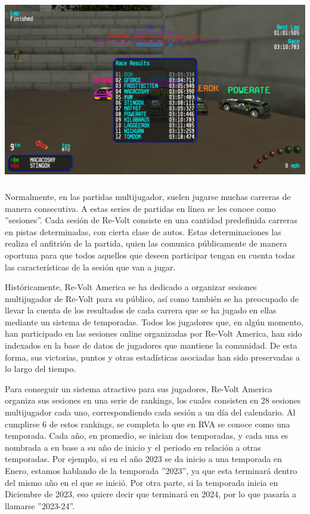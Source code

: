 \includegraphics[width=15cm, height=8cm]{img/results.png}

Normalmente, en las partidas multijugador, suelen jugarse muchas carreras de manera consecutiva. A estas series de partidas en línea se les conoce como ''sesiones''. Cada sesión de Re-Volt consiste en una cantidad predefinida carreras en pistas determinadas, con cierta clase de autos. Estas determinaciones las realiza el anfitrión de la partida, quien las comunica públicamente de manera oportuna para que todos aquellos que deseen participar tengan en cuenta todas las características de la sesión que van a jugar.

Históricamente, Re-Volt America se ha dedicado a organizar sesiones multijugador de Re-Volt para su público, así como también se ha preocupado de llevar la cuenta de los resultados de cada carrera que se ha jugado en ellas mediante un sistema de temporadas. Todos los jugadores que, en algún momento, han participado en las sesiones online organizadas por Re-Volt America, han sido indexados en la base de datos de jugadores que mantiene la comunidad. De esta forma, sus victorias, puntos y otras estadísticas asociadas han sido preservadas a lo largo del tiempo.

Para conseguir un sistema atractivo para sus jugadores, Re-Volt America organiza sus sesiones en una serie de rankings, los cuales consisten en 28 sesiones multijugador cada uno, correspondiendo cada sesión a un día del calendario. Al cumplirse 6 de estos rankings, se completa lo que en RVA se conoce como una temporada. Cada año, en promedio, se inician dos temporadas, y cada una es nombrada a en base a su año de inicio y el periodo en relación a otras temporadas. Por ejemplo, si en el año 2023 se da inicio a una temporada en Enero, estamos hablando de la temporada ''2023'', ya que esta terminará dentro del mismo año en el que se inició. Por otra parte, si la temporada inicia en Diciembre de 2023, eso quiere decir que terminará en 2024, por lo que pasaría a llamarse ''2023-24''.

